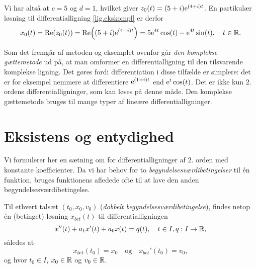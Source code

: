 \begin{example}
\begin{equation}
\end{equation}
Vi har altså at $ c=5 $ og $ d=1 $, hvilket giver $ z_{0}(t) = (5+i)\mathrm{e}^{(4+i)t} $. En partikulær løsning til differentialligning \eqref{lig.ekskompl} er derfor
\begin{equation}
x_0(t) = \mathrm{Re} (z_{0}(t)) = \mathrm{Re} \! \left((5+i)\mathrm{e}^{(4+i)t}\right) = 5\mathrm{e}^{4t}\cos(t) - \mathrm{e}^{4t}\sin(t), \quad t \in \mathbb{R}.
\end{equation}
\end{example}

Som det fremgår af metoden og eksemplet ovenfor går \textit{den komplekse gættemetode} ud på, at man omformer en differentialligning til den tilsvarende komplekse ligning. Det gøres fordi differentiation i disse tilfælde er simplere: det er for eksempel nemmere at differentiere $ \mathrm{e}^{(1+i)t} $ end $ \mathrm{e}^t\cos(t) $. Det er ikke kun 2. ordens differentialligninger, som kan løses på denne måde. Den komplekse gættemetode bruges til mange typer af lineære differentialligninger.

\section{Eksistens og entydighed} \label{subsek.difflig2.eksent1}

Vi formulerer her en sætning om  for differentialligninger af 2. orden med konstante koefficienter. Da vi har behov for to \textit{begyndelsesværdibetingelser} til én funktion, bruges funktionens afledede ofte til at lave den anden begyndelsesværdibetingelse.

\begin{theorem} \label{saet.difflig2.eksent1}
Til ethvert talsæt $ (t_0,x_0,v_0) $ (\textit{dobbelt begyndelsesværdibetingelse}), findes netop én (betinget) løsning $ x_{bet}(t) $ til differentialligningen
\begin{equation}
x''(t) + a_1x'(t) + a_0x(t) = q(t), \quad t \in I, q : I \rightarrow \mathbb{R},
\end{equation}
således at
\begin{equation}
x_{bet}(t_0) = x_0 \quad \mathrm{og} \quad x_{bet}'(t_0) = v_0, 
\end{equation}
og hvor $ t_0 \in I $, $ x_0 \in \mathbb{R} $ og $ v_0 \in \mathbb{R} $.
\end{theorem}

